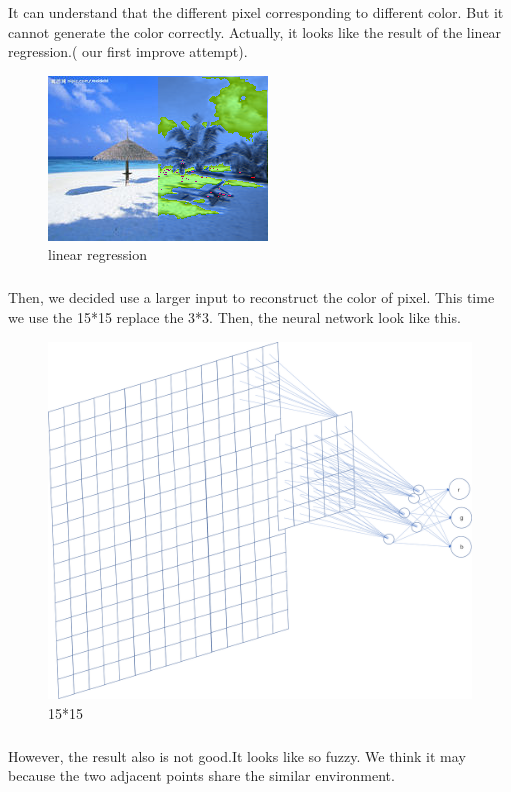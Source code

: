 \documentclass[10pt]{article}
\begin{document}
\pagebreak
It can understand that the different pixel corresponding to different color.
But it cannot generate the color correctly. Actually, it looks like the result of the linear regression.( our first improve attempt).
\begin{figure}[h]
  \centering
  \includegraphics*[scale=1]{微信图片_20210503102108.png}
\caption{ linear regression }
\end{figure}
\pagebreak
\subparagraph{}
Then, we decided use a larger input to reconstruct the color of pixel. This time we use the 15*15 replace the 3*3. Then, the neural network look like this.
\begin{figure}[h]
  \centering
  \includegraphics*[scale=0.25]{图片1.png}
\caption{ 15*15 }
\end{figure}
\subparagraph{}
However, the result also is not good.It looks like so fuzzy. We think it may because the two adjacent points share the similar environment.
\end{document}
